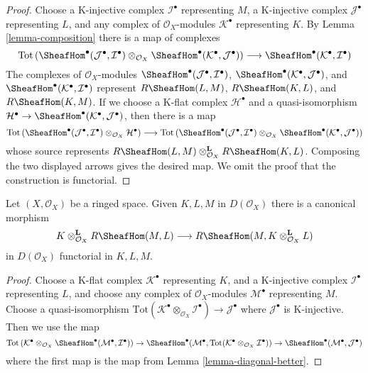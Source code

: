 \begin{proof}
Choose a K-injective complex $\mathcal{I}^\bullet$ representing $M$,
a K-injective complex $\mathcal{J}^\bullet$ representing $L$, and
any complex of $\mathcal{O}_X$-modules $\mathcal{K}^\bullet$ representing $K$.
By Lemma \ref{lemma-composition} there is a map of complexes
$$
\text{Tot}\left(
\SheafHom^\bullet(\mathcal{J}^\bullet, \mathcal{I}^\bullet)
\otimes_{\mathcal{O}_X}
\SheafHom^\bullet(\mathcal{K}^\bullet, \mathcal{J}^\bullet)
\right)
\longrightarrow
\SheafHom^\bullet(\mathcal{K}^\bullet, \mathcal{I}^\bullet)
$$
The complexes of $\mathcal{O}_X$-modules
$\SheafHom^\bullet(\mathcal{J}^\bullet, \mathcal{I}^\bullet)$,
$\SheafHom^\bullet(\mathcal{K}^\bullet, \mathcal{J}^\bullet)$, and
$\SheafHom^\bullet(\mathcal{K}^\bullet, \mathcal{I}^\bullet)$
represent $R\SheafHom(L, M)$, $R\SheafHom(K, L)$, and $R\SheafHom(K, M)$.
If we choose a K-flat complex $\mathcal{H}^\bullet$ and a quasi-isomorphism
$\mathcal{H}^\bullet \to
\SheafHom^\bullet(\mathcal{K}^\bullet, \mathcal{J}^\bullet)$,
then there is a map
$$
\text{Tot}\left(
\SheafHom^\bullet(\mathcal{J}^\bullet, \mathcal{I}^\bullet)
\otimes_{\mathcal{O}_X} \mathcal{H}^\bullet
\right)
\longrightarrow
\text{Tot}\left(
\SheafHom^\bullet(\mathcal{J}^\bullet, \mathcal{I}^\bullet)
\otimes_{\mathcal{O}_X}
\SheafHom^\bullet(\mathcal{K}^\bullet, \mathcal{J}^\bullet)
\right)
$$
whose source represents
$R\SheafHom(L, M) \otimes_{\mathcal{O}_X}^\mathbf{L} R\SheafHom(K, L)$.
Composing the two displayed arrows gives the desired map. We omit the
proof that the construction is functorial.
\end{proof}

\begin{lemma}
\label{lemma-internal-hom-diagonal-better}
Let $(X, \mathcal{O}_X)$ be a ringed space. Given $K, L, M$
in $D(\mathcal{O}_X)$ there is a canonical morphism
$$
K \otimes_{\mathcal{O}_X}^\mathbf{L} R\SheafHom(M, L)
\longrightarrow
R\SheafHom(M, K \otimes_{\mathcal{O}_X}^\mathbf{L} L)
$$
in $D(\mathcal{O}_X)$ functorial in $K, L, M$.
\end{lemma}

\begin{proof}
Choose a K-flat complex $\mathcal{K}^\bullet$ representing $K$,
and a K-injective complex $\mathcal{I}^\bullet$ representing $L$, and
choose any complex of $\mathcal{O}_X$-modules $\mathcal{M}^\bullet$
representing $M$. Choose a quasi-isomorphism
$\text{Tot}(\mathcal{K}^\bullet \otimes_{\mathcal{O}_X} \mathcal{I}^\bullet)
\to \mathcal{J}^\bullet$
where $\mathcal{J}^\bullet$ is K-injective. Then we use the map
$$
\text{Tot}\left(
\mathcal{K}^\bullet \otimes_{\mathcal{O}_X}
\SheafHom^\bullet(\mathcal{M}^\bullet, \mathcal{I}^\bullet)
\right)
\to
\SheafHom^\bullet(\mathcal{M}^\bullet,
\text{Tot}(\mathcal{K}^\bullet \otimes_{\mathcal{O}_X} \mathcal{I}^\bullet))
\to
\SheafHom^\bullet(\mathcal{M}^\bullet, \mathcal{J}^\bullet)
$$
where the first map is the map from Lemma \ref{lemma-diagonal-better}.
\end{proof}

